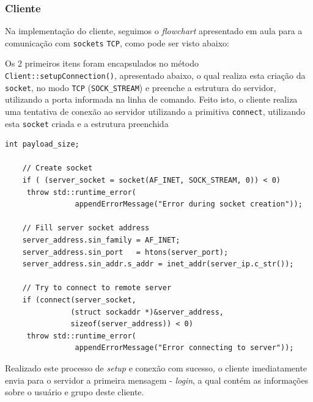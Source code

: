 \documentclass{article}
\begin{document}
\subsubsection{Cliente}
\par Na implementação do cliente, seguimos o \textit{flowchart} apresentado em aula para a comunicação com \texttt{sockets} \texttt{TCP}, como pode ser visto abaixo:
\begin{center}
\end{center}%
\par Os 2 primeiros itens foram encapsulados no método \texttt{Client::setupConnection()}, apresentado abaixo, o qual realiza esta criação da \texttt{socket}, no modo \texttt{TCP} (\texttt{SOCK\_STREAM}) e preenche a estrutura do servidor, utilizando a porta informada na linha de comando. Feito isto, o cliente realiza uma tentativa de conexão ao servidor utilizando a primitiva \texttt{connect}, utilizando esta \texttt{socket} criada e a estrutura preenchida
\\
\begin{lstlisting}[xleftmargin=-.1\textwidth, xrightmargin=-.1\textwidth]
    int payload_size;
    
    // Create socket
    if ( (server_socket = socket(AF_INET, SOCK_STREAM, 0)) < 0)
     throw std::runtime_error(
                appendErrorMessage("Error during socket creation"));
    
    // Fill server socket address
    server_address.sin_family = AF_INET;
    server_address.sin_port   = htons(server_port);
    server_address.sin_addr.s_addr = inet_addr(server_ip.c_str());
    
    // Try to connect to remote server
    if (connect(server_socket, 
               (struct sockaddr *)&server_address, 
               sizeof(server_address)) < 0)
     throw std::runtime_error(
                appendErrorMessage("Error connecting to server"));
\end{lstlisting}
\par Realizado este processo de \textit{setup} e conexão com sucesso, o cliente imediatamente envia para o servidor a primeira mensagem - \textit{login}, a qual contém as informações sobre o usuário e grupo deste cliente.
\end{document}
